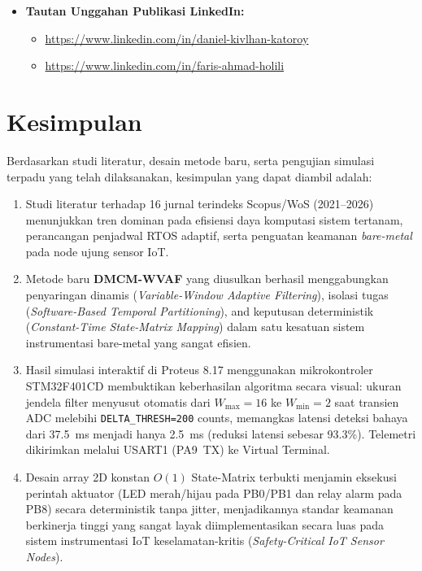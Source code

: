 \documentclass[11pt,a4paper]{article}
\begin{document}
\begin{longtable}
\begin{itemize}
    \item \textbf{Tautan Unggahan Publikasi LinkedIn:}
    \begin{itemize}
        \item \href{https://www.linkedin.com/in/daniel-kivlhan-katoroy}
        {https://www.linkedin.com/in/daniel-kivlhan-katoroy}

        \item \href{https://www.linkedin.com/in/faris-ahmad-holili}
        {https://www.linkedin.com/in/faris-ahmad-holili}
    \end{itemize}

\end{itemize}

\section{Kesimpulan}
\hspace{1.5em}Berdasarkan studi literatur, desain metode baru, serta pengujian simulasi terpadu yang telah dilaksanakan, kesimpulan yang dapat diambil adalah:
\begin{enumerate}
    \item Studi literatur terhadap 16 jurnal terindeks Scopus/WoS (2021--2026) menunjukkan tren dominan pada efisiensi daya komputasi sistem tertanam, perancangan penjadwal RTOS adaptif, serta penguatan keamanan \textit{bare-metal} pada node ujung sensor IoT.
    \item Metode baru \textbf{DMCM-WVAF} yang diusulkan berhasil menggabungkan penyaringan dinamis (\textit{Variable-Window Adaptive Filtering}), isolasi tugas (\textit{Software-Based Temporal Partitioning}), and keputusan deterministik (\textit{Constant-Time State-Matrix Mapping}) dalam satu kesatuan sistem instrumentasi bare-metal yang sangat efisien.
    \item Hasil simulasi interaktif di Proteus 8.17 menggunakan mikrokontroler STM32F401CD membuktikan keberhasilan algoritma secara visual: ukuran jendela filter menyusut otomatis dari $W_{\max}=16$ ke $W_{\min}=2$ saat transien ADC melebihi \texttt{DELTA\_THRESH=200} counts, memangkas latensi deteksi bahaya dari 37.5~ms menjadi hanya 2.5~ms (reduksi latensi sebesar 93.3\%). Telemetri dikirimkan melalui USART1 (PA9~TX) ke Virtual Terminal.
    \item Desain array 2D konstan $O(1)$ State-Matrix terbukti menjamin eksekusi perintah aktuator (LED merah/hijau pada PB0/PB1 dan relay alarm pada PB8) secara deterministik tanpa jitter, menjadikannya standar keamanan berkinerja tinggi yang sangat layak diimplementasikan secara luas pada sistem instrumentasi IoT keselamatan-kritis (\textit{Safety-Critical IoT Sensor Nodes}).
\end{enumerate}


\end{longtable}
\end{document}
